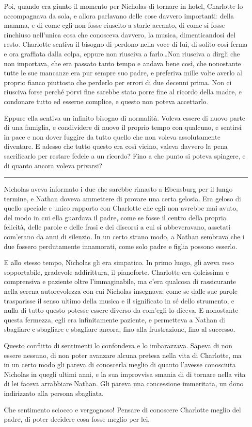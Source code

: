 Poi, quando era giunto il momento per Nicholas di tornare in hotel, Charlotte lo accompagnava da
sola, e allora parlavano delle cose davvero importanti: della mamma, e di come egli non fosse
riuscito a starle accanto, di come si fosse rinchiuso nell'unica cosa che conosceva davvero, la
musica, dimenticandosi del resto. Charlotte sentiva il bisogno di perdono nella voce di lui, di
solito così ferma e ora graffiata dalla colpa, eppure non riusciva a farlo\dots Non riusciva a
dirgli che non importava, che era passato tanto tempo e andava bene così, che nonostante tutte le
sue mancanze era pur sempre suo padre, e preferiva mille volte averlo al proprio fianco piuttosto
che perderlo per errori di due decenni prima. Non ci riusciva forse perché porvi fine sarebbe stato
porre fine al ricordo della madre, e condonare tutto ed esserne complice, e questo non poteva
accettarlo.

Eppure ella sentiva un infinito bisogno di normalità. Voleva essere di nuovo parte di una famiglia,
e condividere di nuovo il proprio tempo con qualcuno, e sentirsi in pace e non dover fuggire da
tutto quello che non voleva assolutamente diventare. E adesso che tutto questo era così vicino,
valeva davvero la pena sacrificarlo per restare fedele a un ricordo? Fino a che punto si poteva
spingere, e di quanto ancora voleva privarsi?

\plainbreak{1}

Nicholas aveva informato i due che sarebbe rimasto a Ebensburg per il lungo termine, e Nathan doveva
ammettere di provare una certa gelosia. Era geloso di quello speciale e unico rapporto con Charlotte
che egli non avrebbe mai avuto, del modo in cui ella guardava il padre, come se fosse il centro
della propria felicità, delle parole e delle frasi e dei discorsi a cui si abbeveravano, assetati
com'erano da anni di silenzio. In un certo strano modo, a Nathan sembrava che i due fossero
perdutamente innamorati, come solo padre e figlia possono esserlo.

E allo stesso tempo, Nicholas gli era simpatico. In primo luogo, gli aveva reso sopportabile,
gradevole addirittura, il pianoforte. Charlotte era dolcissima e comprensiva e paziente oltre
l'immaginabile, ma c'era qualcosa di rassicurante nella serena autorevolezza con cui Nicholas
insegnava: come se dalle sue parole trasparisse il senso ultimo della musica e il significato in sé
dello strumento, e nulla di tutto questo potesse essere diverso da com'egli lo diceva. E nonostante
questa fermezza, egli era infinitamente paziente, e permetteva a Nathan di sbagliare e sbagliare e
sbagliare ancora, fino alla frustrazione, fino al successo.

Questo conflitto di sentimenti lo confondeva e lo imbarazzava. Sapeva di non essere nessuno, di non
poter avanzare alcuna pretesa nella vita di Charlotte, ma in un certo modo gli pareva di conoscerla
meglio di quanto l'avesse conosciuta Nicholas in quegli ultimi anni, e la sua improvvisa smania di
di tornare nella vita di lei faceva arrabbiare Nathan. Gli pareva una concessione immeritata, un
dono indirizzato alla persona sbagliata.

Che sentimento sciocco e vergognoso! Pensare di conoscere Charlotte meglio del padre, di poter
decidere cosa fosse meglio per lei.
